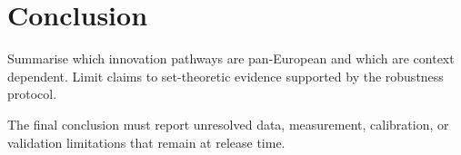 \section{Conclusion}

Summarise which innovation pathways are pan-European and which are context
dependent. Limit claims to set-theoretic evidence supported by the robustness
protocol.

The final conclusion must report unresolved data, measurement, calibration, or
validation limitations that remain at release time.
